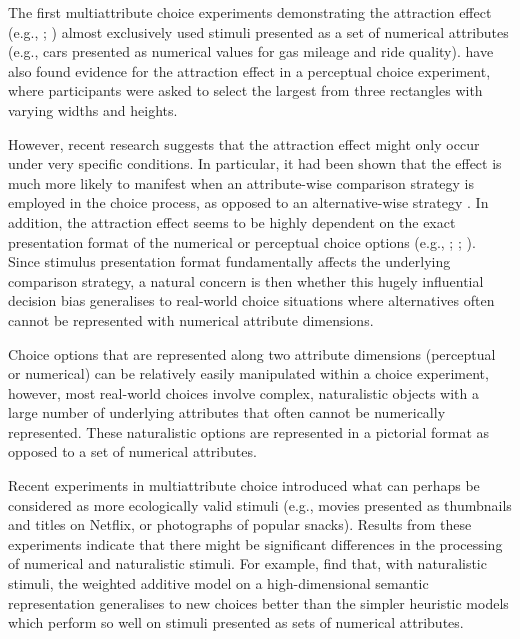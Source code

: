 \documentclass[12pt, a4paper]{article}
\begin{document}
The first multiattribute choice experiments demonstrating the attraction effect (e.g., ; ) almost exclusively used stimuli presented as a set of numerical attributes (e.g., cars presented as numerical values for gas mileage and ride quality).  have also found evidence for the attraction effect in a perceptual choice experiment, where participants were asked to select the largest from three rectangles with varying widths and heights. 


However, recent research suggests that the attraction effect might only occur under very specific conditions.
In particular, it had been shown that the effect is much more likely to manifest when an attribute-wise comparison strategy is employed in the choice process, as opposed to an alternative-wise strategy \cite{Noguchi2014a}. In addition, the attraction effect seems to be highly dependent on the exact presentation format of the numerical or perceptual choice options (e.g., ; ; ). Since stimulus presentation format fundamentally affects the underlying comparison strategy, a natural concern is then whether this hugely influential decision bias generalises to real-world choice situations where alternatives often cannot be represented with numerical attribute dimensions.  


Choice options that are represented along two attribute dimensions (perceptual or numerical) can be relatively easily manipulated within a choice experiment, however, most real-world choices involve complex, naturalistic objects with a large number of underlying attributes that often cannot be numerically represented. 
These naturalistic options are represented in a pictorial format as opposed to a set of numerical attributes.

 Recent experiments in multiattribute choice introduced what can perhaps be considered as more ecologically valid stimuli (e.g., movies presented as thumbnails and titles on Netflix, or photographs of popular snacks). Results from these experiments indicate that there might be significant differences in the processing of numerical and naturalistic stimuli. For example,  find that, with naturalistic stimuli, the weighted additive model on a high-dimensional semantic representation generalises to new choices better than the simpler heuristic models which perform so well on stimuli presented as sets of numerical attributes.
\end{document}
